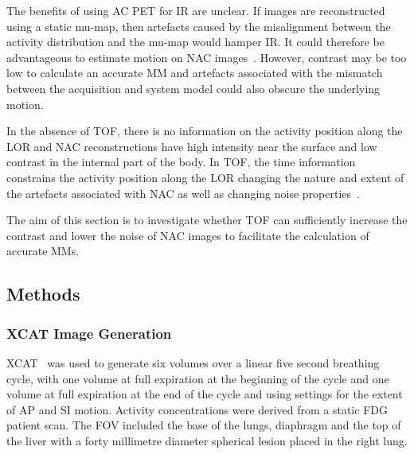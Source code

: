        The benefits of using \gls{AC} \gls{PET} for \gls{IR} are unclear. If images are reconstructed using a static \gls{mu-map}, then artefacts caused by the misalignment between the activity distribution and the \gls{mu-map} would hamper \gls{IR}. It could therefore be advantageous to estimate motion on \gls{NAC} images~\cite{WenjiaBai2011}. However, contrast may be too low to calculate an accurate \gls{MM} and artefacts associated with the mismatch between the acquisition and system model could also obscure the underlying motion. 
        
        In the absence of \gls{TOF}, there is no information on the activity position along the \gls{LOR} and \gls{NAC} reconstructions have high intensity near the surface and low contrast in the internal part of the body. In \gls{TOF}, the time information constrains the activity position along the \gls{LOR} changing the nature and extent of the artefacts associated with \gls{NAC} as well as changing noise properties~\cite{Ter-Pogossian1981}.
        
        The aim of this section is to investigate whether \gls{TOF} can sufficiently increase the contrast and lower the noise of \gls{NAC} images to facilitate the calculation of accurate \gls{MM}s.
        
        \subsection{Methods} \label{impact_of_tof_on_respiratory_motion_modelling_using_nac_pet_methods}
            \subsubsection{XCAT Image Generation} \label{impact_of_tof_on_respiratory_motion_modelling_using_nac_pet_methods_xcat_image_generation}
                \gls{XCAT}~ was used to generate six volumes over a linear five second breathing cycle, with one volume at full expiration at the beginning of the cycle and one volume at full expiration at the end of the cycle and using settings for the extent of \gls{AP} and \gls{SI} motion. Activity concentrations were derived from a static \gls{FDG} patient scan. The \gls{FOV} included the base of the lungs, diaphragm and the top of the liver with a forty millimetre diameter spherical lesion placed in the right lung.
            
